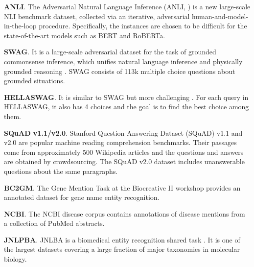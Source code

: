 \documentclass[11pt,a4paper]{article}
\begin{document}
\noindent  \textbf{ANLI}.
The Adversarial Natural Language Inference (ANLI, \citet{nie2019adversarial}) is a new large-scale NLI benchmark dataset, collected via an iterative, adversarial human-and-model-in-the-loop procedure. Specifically, the instances are chosen to be difficult for the state-of-the-art models such as BERT and RoBERTa.

\noindent  \textbf{SWAG}. It is a large-scale adversarial dataset for the task of grounded commonsense inference, which unifies natural language inference and physically grounded reasoning \cite{zellers2018swag}. SWAG consists of 113k multiple choice questions about grounded situations. 

\noindent  \textbf{HELLASWAG}. It is similar to SWAG but more challenging \cite{zellers2019hellaswag}. For each query in HELLASWAG, it also has 4 choices and the goal is to find the best choice among them.

\noindent  \textbf{SQuAD v1.1/v2.0}. Stanford Question
Answering Dataset (SQuAD) v1.1 and v2.0 \cite{squad1,squad2} are popular machine reading comprehension benchmarks. Their passages come from approximately 500 Wikipedia articles and the questions and answers are obtained by crowdsourcing. The SQuAD v2.0 dataset includes unanswerable questions about the same paragraphs.

\noindent  \textbf{BC2GM}. The Gene Mention Task at the Biocreative II workshop \cite{smith2008bc2gm} provides an annotated dataset for gene name entity recognition.

\noindent  \textbf{NCBI}. The NCBI disease corpus \cite{dogan2014ncbi} contains  annotations of disease mentions from a collection of PubMed abstracts.

\noindent  \textbf{JNLPBA}. JNLBA is a biomedical entity recognition shared task  \cite{collier-kim-2004-JNLPBA}. It is one of the largest datasets covering a large fraction of major taxonomies in molecular biology.
\end{document}
